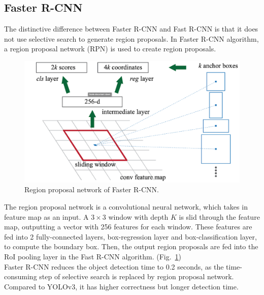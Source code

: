 \documentclass[letterpaper]{article} %
\begin{document}
\subsection{Faster R-CNN}
The distinctive difference between Faster R-CNN and Fast R-CNN is that it does not use selective search to generate region proposals. In Faster R-CNN algorithm, a region proposal network (RPN) is used to create region proposals. \cite{fasterRcnn}\\
\begin{figure}[ht]
    \hspace{-17mm}
    \centering
    \includegraphics[width=0.85\linewidth,height = 0.55\linewidth]{Figure/faster_r_cnn.png}
    \caption{\footnotesize{Region proposal network of Faster R-CNN.}}
    \label{fig:rpn}
    \vspace{0mm}
\end{figure}

\noindent The region proposal network is a convolutional neural network, which takes in feature map as an input. A $3 \times 3$ window with depth $K$ is slid through the feature map, outputting a vector with 256 features for each window. These features are fed into 2 fully-connected layers, box-regression layer and box-classification layer, to compute the boundary box. Then, the output region proposals are fed into the RoI pooling layer in the Fast R-CNN algorithm. (Fig.~\ref{fig:rpn})\\

\noindent 
Faster R-CNN reduces the object detection time to 0.2 seconds, as the time-consuming step of selective search is replaced by region proposal network. Compared to YOLOv3, it has higher correctness but longer detection time.
\end{document}
